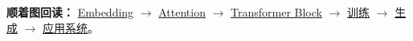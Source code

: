 \noindent
\textbf{顺着图回读：}
\hyperref[intro:20-embeddings]{Embedding} $\rightarrow$
\hyperref[intro:11-softmax-memory]{Attention} $\rightarrow$
\hyperref[intro:22-transformer-architecture]{Transformer Block} $\rightarrow$
\hyperref[intro:22c-language-training]{训练} $\rightarrow$
\hyperref[intro:23-llm-systems]{生成} $\rightarrow$
\hyperref[intro:23d-agent-systems]{应用系统}。



